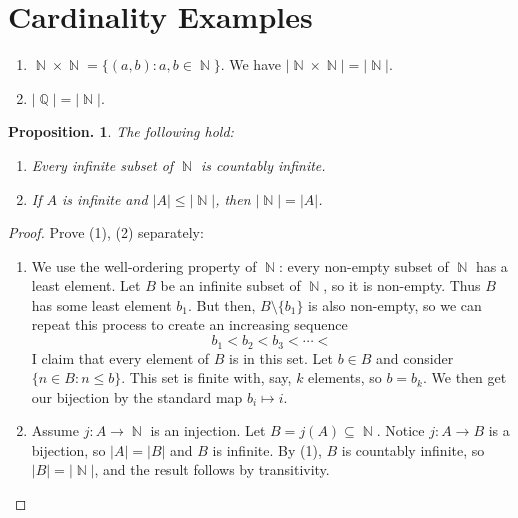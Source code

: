 \documentclass[11pt, a4paper]{memoir}
\DeclareMathOperator{\N}{{\mathbb{N}}}
\DeclareMathOperator{\Q}{{\mathbb{Q}}}
\theoremstyle{change}
\newtheorem{proposition}[theorem]{Proposition.}
\theoremstyle{plain}
\theoremstyle{nonumberplain}
\newtheorem{proof}{Proof}
\numberwithin{equation}{section}
\begin{document}
\section{Cardinality Examples}
\begin{enumerate}
    \item $\N\times\N=\{(a,b):a,b\in\N\}$. We have $|\N\times\N|=|\N|$.
    \item $|\Q|=|\N|$.
\end{enumerate}
\begin{proposition} The following hold:
    \begin{enumerate}[label=(\arabic*)]
        \item Every infinite subset of $\N$ is countably infinite.
        \item If $A$ is infinite and $|A|\leq|\N|$, then $|\N|=|A|$.
    \end{enumerate}
\end{proposition}
\begin{proof} Prove (1), (2) separately:
    \begin{enumerate}[label=(\arabic*)]
        \item We use the well-ordering property of $\N$: every non-empty subset of $\N$ has a least element. Let $B$
            be an infinite subset of $\N$, so it is non-empty. Thus $B$ has some least element $b_1$. But then, $B\setminus\{b_1\}$
            is also non-empty, so we can repeat this process to create an increasing sequence
            \[b_1<b_2<b_3<\cdots<\]
            I claim that every element of $B$ is in this set. Let $b\in B$ and consider $\{n\in B:n\leq b\}$. This set is
            finite with, say, $k$ elements, so $b=b_k$. We then get our bijection by the standard map $b_i\mapsto i$.
        \item Assume $j:A\to\N$ is an injection. Let $B=j(A)\subseteq\N$. Notice $j:A\to B$ is a bijection, so $|A|=|B|$
            and $B$ is infinite. By (1), $B$ is countably infinite, so $|B|=|\N|$, and the result follows by transitivity.
    \end{enumerate}
\end{proof}
\end{document}
